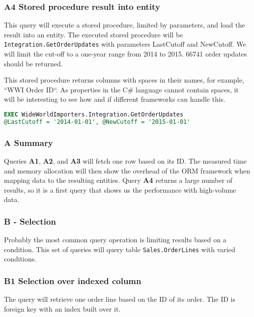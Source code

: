 \subsubsection*{A4 Stored procedure result into entity} \label{query:a4}
This query will execute a stored procedure, limited by parameters, and load the result into an entity.
The executed stored procedure will be \texttt{Integration.GetOrderUpdates} with parameters LastCutoff and NewCutoff. 
We will limit the cut-off to a one-year range from 2014 to 2015. 66741 order updates should be returned.

This stored procedure returns columns with spaces in their names, for example, ``WWI Order ID``. As properties in the C\# language cannot contain spaces, it will be interesting to see how and if different frameworks can handle this.

\begin{lstlisting}[language=SQL]
EXEC WideWorldImporters.Integration.GetOrderUpdates 
@LastCutoff = '2014-01-01', @NewCutoff = '2015-01-01'
\end{lstlisting}

\subsubsection*{A Summary}
Queries \textbf{A1}, \textbf{A2}, and \textbf{A3} will fetch one row based on its ID. The measured time and memory allocation will then show the overhead of the ORM framework when mapping data to the resulting entities. Query \textbf{A4} returns a large number of results, so it is a first query that shows us the performance with high-volume data.

\subsubsection{B - Selection}
Probably the most common query operation is limiting results based on a condition. This set of queries will query table \texttt{Sales.OrderLines} with varied conditions.

\subsubsection*{B1 Selection over indexed column} \label{query:b1}
The query will retrieve one order line based on the ID of its order. The ID is foreign key with an index built over it.

